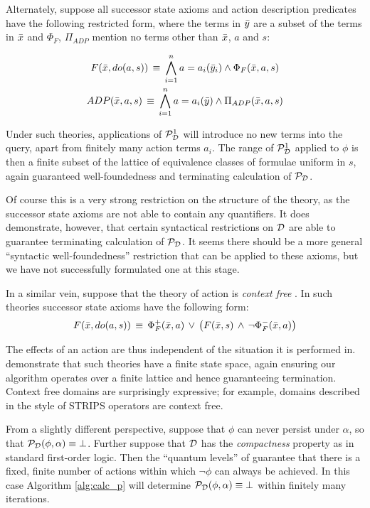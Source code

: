 Alternately, suppose all successor state axioms and action description
predicates have the following restricted form, where the terms in
$\bar{y}$ are a subset of the terms in $\bar{x}$ and $\Phi_{F}$,
$\Pi_{ADP}$ mention no terms other than $\bar{x}$, $a$ and $s$:

\begin{gather*}
F(\bar{x},do(a,s))\,\equiv\,\bigwedge_{i=1}^{n}a=a_{i}(\bar{y}_{i})\wedge\Phi_{F}(\bar{x},a,s)\\
ADP(\bar{x},a,s)\,\equiv\,\bigwedge_{i=1}^{n}a=a_{i}(\bar{y})\wedge\Pi_{ADP}(\bar{x},a,s)\end{gather*}


Under such theories, applications of $\mathcal{P}^{1}_{\mathcal{D}}$ will introduce no new
terms into the query, apart from finitely many action terms $a_{i}$.
The range of $\mathcal{P}^{1}_{\mathcal{D}}$ applied to $\phi$ is then a finite subset
of the lattice of equivalence classes of formulae uniform in $s$,
again guaranteed well-foundedness and terminating calculation of $\mathcal{P}_{\mathcal{D}}$.

Of course this is a very strong restriction on the structure of the
theory, as the successor state axioms are not able to contain any
quantifiers. It does demonstrate, however, that certain syntactical
restrictions on $\mathcal{D}$ are able to guarantee terminating calculation
of $\mathcal{P}_{\mathcal{D}}$. It seems there should be a more general {}``syntactic
well-foundedness'' restriction that can be applied to these axioms,
but we have not successfully formulated one at this stage.

In a similar vein, suppose that the theory of action is \emph{context
free} \citep{reiter97progression}. In such theories successor state
axioms have the following form:\[
F(\bar{x},do(a,s))\,\equiv\,\Phi_{F}^{+}(\bar{x},a)\,\vee\,\left(F(\bar{x},s)\,\wedge\,\neg\Phi_{F}^{-}(\bar{x},a)\right)\]


The effects of an action are thus independent of the situation it
is performed in. \citet{levesque98what_robots_can_do} demonstrate
that such theories have a finite state space, again ensuring our algorithm
operates over a finite lattice and hence guaranteeing termination.
Context free domains are surprisingly expressive; for example, domains
described in the style of STRIPS operators are context free.

From a slightly different perspective, suppose that $\phi$ can never
persist under $\alpha$, so that $\mathcal{P}_{\mathcal{D}}(\phi,\alpha)\equiv\bot$.
Further suppose that $\mathcal{D}$ has the \emph{compactness} property as
in standard first-order logic. Then the {}``quantum levels'' of
\citet{savelli06sc_quantum_levels} guarantee that there is a fixed,
finite number of actions within which $\neg\phi$ can always be achieved.
In this case Algorithm \ref{alg:calc_p} will determine $\mathcal{P}_{\mathcal{D}}(\phi,\alpha)\equiv\bot$
within finitely many iterations.

